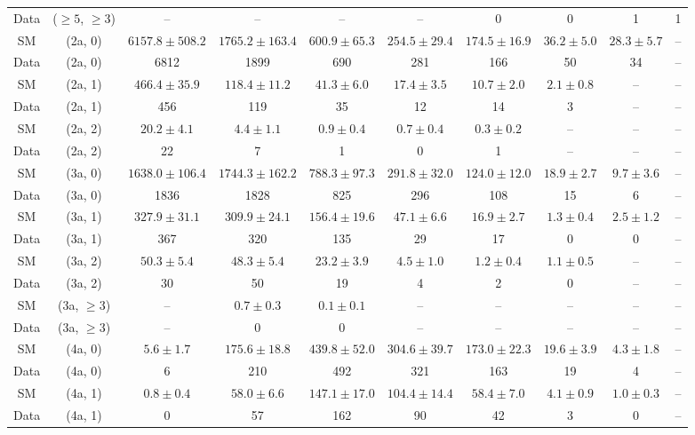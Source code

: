 \begin{table}[h!]
{\begin{tabular}{cccccccccc}
	Data & ($\ge5$, $\ge3$) & -- & -- & -- & -- & 0 & 0 & 1 & 1 \\[0.5ex] 
	SM & (2a, 0) & $6157.8\pm 508.2$ & $1765.2\pm 163.4$ & $600.9\pm 65.3$ & $254.5\pm 29.4$ & $174.5\pm 16.9$ & $36.2\pm 5.0$ & $28.3\pm 5.7$ & -- \\[0.5ex] 
	Data & (2a, 0) & 6812 & 1899 & 690 & 281 & 166 & 50 & 34 & -- \\[0.5ex] 
	SM & (2a, 1) & $466.4\pm 35.9$ & $118.4\pm 11.2$ & $41.3\pm 6.0$ & $17.4\pm 3.5$ & $10.7\pm 2.0$ & $2.1\pm 0.8$ & -- & -- \\[0.5ex] 
	Data & (2a, 1) & 456 & 119 & 35 & 12 & 14 & 3 & -- & -- \\[0.5ex] 
	SM & (2a, 2) & $20.2\pm 4.1$ & $4.4\pm 1.1$ & $0.9\pm 0.4$ & $0.7\pm 0.4$ & $0.3\pm 0.2$ & -- & -- & -- \\[0.5ex] 
	Data & (2a, 2) & 22 & 7 & 1 & 0 & 1 & -- & -- & -- \\[0.5ex] 
	SM & (3a, 0) & $1638.0\pm 106.4$ & $1744.3\pm 162.2$ & $788.3\pm 97.3$ & $291.8\pm 32.0$ & $124.0\pm 12.0$ & $18.9\pm 2.7$ & $9.7\pm 3.6$ & -- \\[0.5ex] 
	Data & (3a, 0) & 1836 & 1828 & 825 & 296 & 108 & 15 & 6 & -- \\[0.5ex] 
	SM & (3a, 1) & $327.9\pm 31.1$ & $309.9\pm 24.1$ & $156.4\pm 19.6$ & $47.1\pm 6.6$ & $16.9\pm 2.7$ & $1.3\pm 0.4$ & $2.5\pm 1.2$ & -- \\[0.5ex] 
	Data & (3a, 1) & 367 & 320 & 135 & 29 & 17 & 0 & 0 & -- \\[0.5ex] 
	SM & (3a, 2) & $50.3\pm 5.4$ & $48.3\pm 5.4$ & $23.2\pm 3.9$ & $4.5\pm 1.0$ & $1.2\pm 0.4$ & $1.1\pm 0.5$ & -- & -- \\[0.5ex] 
	Data & (3a, 2) & 30 & 50 & 19 & 4 & 2 & 0 & -- & -- \\[0.5ex] 
	SM & (3a, $\ge3$) & -- & $0.7\pm 0.3$ & $0.1\pm 0.1$ & -- & -- & -- & -- & -- \\[0.5ex] 
	Data & (3a, $\ge3$) & -- & 0 & 0 & -- & -- & -- & -- & -- \\[0.5ex] 
	SM & (4a, 0) & $5.6\pm 1.7$ & $175.6\pm 18.8$ & $439.8\pm 52.0$ & $304.6\pm 39.7$ & $173.0\pm 22.3$ & $19.6\pm 3.9$ & $4.3\pm 1.8$ & -- \\[0.5ex] 
	Data & (4a, 0) & 6 & 210 & 492 & 321 & 163 & 19 & 4 & -- \\[0.5ex] 
	SM & (4a, 1) & $0.8\pm 0.4$ & $58.0\pm 6.6$ & $147.1\pm 17.0$ & $104.4\pm 14.4$ & $58.4\pm 7.0$ & $4.1\pm 0.9$ & $1.0\pm 0.3$ & -- \\[0.5ex] 
	Data & (4a, 1) & 0 & 57 & 162 & 90 & 42 & 3 & 0 & -- \\[0.5ex] 

\end{tabular}}
\end{table}
